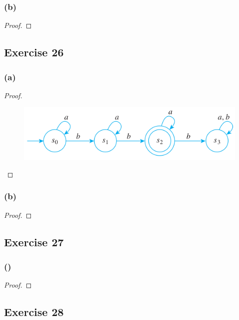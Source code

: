 \documentclass[14pt]{extarticle}
\begin{document}
\subsubsection{(b)}

\begin{proof}

\end{proof}

\subsection{Exercise 26}

\subsubsection{(a)}

\begin{proof}
\begin{figure}[ht!]
\centering
\includegraphics[scale=0.5]{../images/12.2.26.a.png}
\end{figure}
\end{proof}

\subsubsection{(b)}

\begin{proof}

\end{proof}

\subsection{Exercise 27}

\subsubsection{()}

\begin{proof}

\end{proof}

\subsection{Exercise 28}
\end{document}
